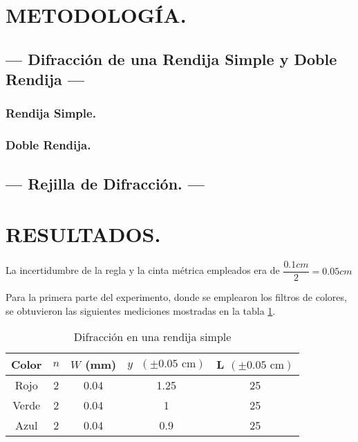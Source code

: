 \documentclass[12pt,a4paper]{article}
\begin{document}
\section{METODOLOGÍA.} %

\subsection{--- Difracción de una Rendija Simple y Doble Rendija ---} %
\label{sub:difraccion_simple}

\subsubsection{Rendija Simple.} %
\label{subs:rendija_simple}

\subsubsection{Doble Rendija.} %
\label{subs:doble_rendija}



\subsection{--- Rejilla de Difracción. ---} %
\label{sub:reijlla_de_difraccion}


\section{RESULTADOS.} %

	 La incertidumbre de la regla y la cinta métrica empleados era de $ \dfrac{0.1 cm}{2}=0.05 cm $
	 
	 Para la primera parte del experimento, donde se emplearon los filtros de colores, se obtuvieron las siguientes mediciones mostradas en la tabla \ref{tab:1}.
	 
	 \begin{table}[!htb]
	 	\centering
	 	\caption{Difracción en una rendija simple}
	 	\begin{tabular}{|c|c|c|c|c|}
	 		\hline
	 		Color & $ n $ & $ W $ (mm) & $ y\mbox{ }(\pm0.05\mbox{ cm})$  & L $(\pm0.05\mbox{ cm})$ \\
	 		\hline
	 		Rojo & 2 & 0.04 & 1.25 & 25 \\
	 		\hline
	 		Verde & 2 & 0.04 & 1 & 25 \\
	 		\hline
	 		Azul & 2 & 0.04 & 0.9 & 25 \\
	 		\hline
	 	\end{tabular}
	 	\label{tab:1}
	 \end{table}
	 
\end{document}
